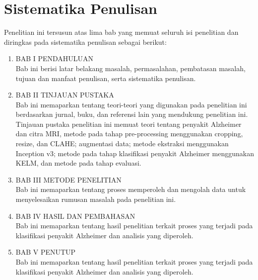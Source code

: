     \section{Sistematika Penulisan}
    Penelitian ini tersusun atas lima bab yang memuat seluruh isi penelitian dan diringkas pada sistematika penulisan sebagai berikut:
    \begin{enumerate}
        \item BAB I PENDAHULUAN\\
        Bab ini berisi latar belakang masalah, permasalahan, pembatasan masalah, tujuan dan manfaat penulisan, serta sistematika penulisan.
        \item BAB II TINJAUAN PUSTAKA\\
        Bab ini memaparkan tentang teori-teori yang digunakan pada penelitian ini berdasarkan jurnal, buku, dan referensi lain yang mendukung penelitian ini. Tinjauan pustaka penelitian ini memuat teori tentang penyakit Alzheimer dan citra MRI, metode pada tahap pre-processing menggunakan cropping, resize, dan CLAHE; augmentasi data; metode ekstraksi menggunakan Inception v3; metode pada tahap klasifikasi penyakit Alzheimer menggunakan KELM, dan metode pada tahap evaluasi.
        \item BAB III METODE PENELITIAN\\
        Bab ini memaparkan tentang proses memperoleh dan mengolah data untuk menyelesaikan rumusan masalah pada penelitian ini.
        \item BAB IV HASIL DAN PEMBAHASAN\\
        Bab ini memaparkan tentang hasil penelitian terkait proses yang terjadi pada klasifikasi penyakit Alzheimer dan analisis yang diperoleh.
        \item BAB V PENUTUP\\
        Bab ini memaparkan tentang hasil penelitian terkait proses yang terjadi pada klasifikasi penyakit Alzheimer dan analisis yang diperoleh.
    \end{enumerate}